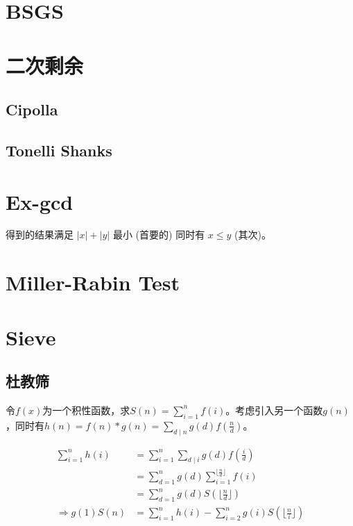 \section{BSGS}

\section{二次剩余}
\subsection{Cipolla}
\subsection{Tonelli Shanks}

\section{Ex-gcd}
得到的结果满足 $|x|+|y|$ 最小 (首要的) 同时有 $x ≤ y$ (其次)。

\section{Miller-Rabin Test}

\section{Sieve}
\subsection{杜教筛}
令$f(x)$为一个积性函数，求$S(n)=\sum_{i=1}^{n}f(i)$。考虑引入另一个函数$g(n)$，同时有$h(n)=f(n)*g(n)=\sum_{d \mid n}g(d)f(\frac{n}{d})$。

$$
\begin{aligned}
\sum_{i=1}^{n}{h(i)}
& = \sum_{i=1}^{n}\sum_{d \mid i}{g(d)f(\frac{i}{d})} \\
& = \sum_{d=1}^{n}{g(d)}\sum_{i=1}^{\lfloor \frac{n}{d} \rfloor}{f(i)} \\
& = \sum_{d=1}^{n}{g(d)S(\lfloor \frac{n}{d} \rfloor)} \\
\Rightarrow 
g(1)S(n) 
& = \sum_{i=1}^{n}{h(i)}-\sum_{i=2}^{n}{g(i)S(\lfloor \frac{n}{i} \rfloor)}
\end{aligned}
$$

